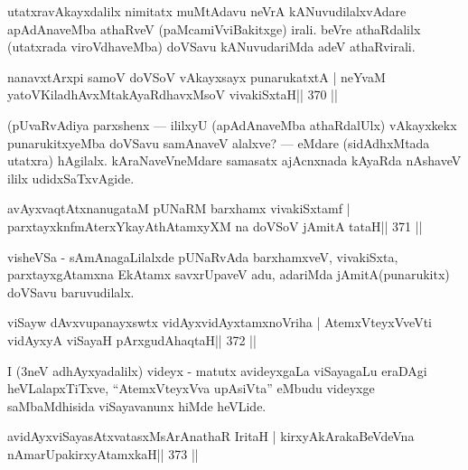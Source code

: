 \begin{artha}
utatxravAkayxdalilx nimitatx muMtAdavu neVrA kANuvudilalxvAdare  apAdAna\-veMba athaRveV (paMcamiVviBakitxge) irali. beVre athaRdalilx  (utatxrada viroVdhaveMba) doVSavu kANuvudariMda adeV athaRvirali.
\end{artha}

\begin{shl}
nanavxtArxpi samoV doVSoV vAkayxsayx punarukatxtA |
neYvaM yatoV\s KiladhAvxMtakAyaRdhavxMsoV vivakiSxtaH\hfill || 370 ||
\end{shl}

\begin{artha}
(pUvaRvAdiya parxshenx  {\rm ---}  ililxyU (apAdAnaveMba athaRdalUlx) 
vAkayxkekx punarukitxyeMba doVSavu samAnaveV alalxve?  {\rm ---}  eMdare 
(sidAdhxMtada utatxra) hAgilalx. kAraNaveVneMdare samasatx ajAcnxnada 
kAyaRda nAshaveV ililx udidxSaTxvAgide.
\end{artha}


\begin{shl}
avAyxvaqtAtxnanugataM pUNaRM barxhamx vivakiSxtamf |
parxtayxknfmAterxYkayAthAtamxyXM na doVSoV jAmitA tataH\hfill || 371 ||
\end{shl}

\begin{artha}
visheVSa - sAmAnagaLilalxde pUNaRvAda barxhamxveV, vivakiSxta, parxtayxgAtamxna EkAtamx savxrUpaveV adu, adariMda jAmitA(punarukitx) doVSavu baruvudilalx.
\end{artha}


\begin{shl}
viSayw dAvxvupanayxswtx vidAyxvidAyxtamxnoVriha |
AtemxVteyxVveVti vidAyxyA viSayaH pArxgudAhaqtaH\hfill || 372 ||
\end{shl}

\begin{artha}
I (3neV adhAyxyadalilx) videyx - matutx avideyxgaLa viSayagaLu eraDAgi heVLalapxTiTxve, ``AtemxVteyxVva upAsiVta'' eMbudu videyxge saMbaMdhisida viSayavanunx hiMde heVLide.
\end{artha}

\begin{shl}
avidAyxviSayasAtxvatasxMsArAnathaR IritaH |
kirxyAkArakaBeVdeVna nAmarUpakirxyAtamxkaH\hfill || 373 ||
\end{shl}

